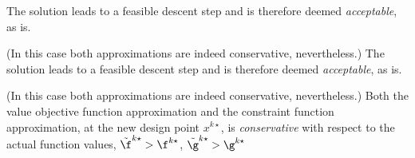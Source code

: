 \bigskip
 The solution leads to a feasible descent step and                     is therefore deemed \emph{acceptable}, as is. 
 
(In this case both approximations are indeed conservative,                         nevertheless.)\bigskip
 The solution leads to a feasible descent step and                     is therefore deemed \emph{acceptable}, as is. 
 
(In this case both approximations are indeed conservative,                         nevertheless.)\bigskip 
 Both the value objective function approximation                     and the constraint function approximation, at the new design point                     $x^{k\star}$, is \emph{conservative} with respect to the actual function                     values, $\tilde {\f}^{k\star} > {\f}^{k\star}$,                     $\tilde {\g}^{k\star} > {\g}^{k\star}$ 


